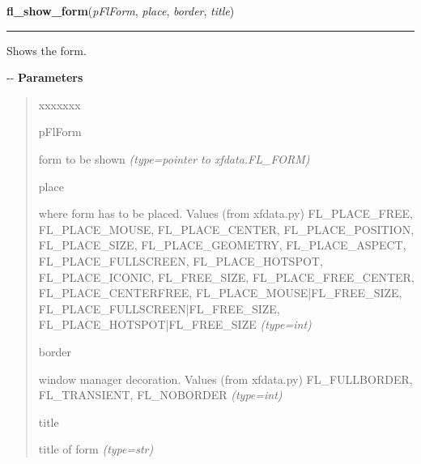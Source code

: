     \label{xformslib:flbasic:fl_show_form}

    \vspace{0.5ex}

\hspace{.8\funcindent}\begin{boxedminipage}{\funcwidth}

    \raggedright \textbf{fl\_show\_form}(\textit{pFlForm}, \textit{place}, \textit{border}, \textit{title})

    \vspace{-1.5ex}

    \rule{\textwidth}{0.5\fboxrule}
\setlength{\parskip}{2ex}

Shows the form.

-{}-
\setlength{\parskip}{1ex}
      \textbf{Parameters}
      \vspace{-1ex}

      \begin{quote}
        \begin{Ventry}{xxxxxxx}

          \item[pFlForm]


form to be shown
            {\it (type=pointer to xfdata.FL\_FORM)}

          \item[place]


where form has to be placed. Values (from xfdata.py) FL\_PLACE\_FREE,
FL\_PLACE\_MOUSE, FL\_PLACE\_CENTER, FL\_PLACE\_POSITION, FL\_PLACE\_SIZE,
FL\_PLACE\_GEOMETRY, FL\_PLACE\_ASPECT, FL\_PLACE\_FULLSCREEN,
FL\_PLACE\_HOTSPOT, FL\_PLACE\_ICONIC, FL\_FREE\_SIZE, FL\_PLACE\_FREE\_CENTER,
FL\_PLACE\_CENTERFREE, FL\_PLACE\_MOUSE|FL\_FREE\_SIZE,
FL\_PLACE\_FULLSCREEN|FL\_FREE\_SIZE, FL\_PLACE\_HOTSPOT|FL\_FREE\_SIZE
            {\it (type=int)}

          \item[border]


window manager decoration. Values (from xfdata.py) FL\_FULLBORDER,
FL\_TRANSIENT, FL\_NOBORDER
            {\it (type=int)}

          \item[title]


title of form
            {\it (type=str)}

        \end{Ventry}


\end{quote}
\end{boxedminipage}
